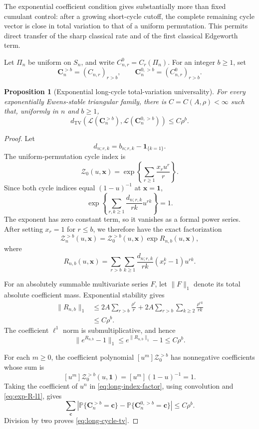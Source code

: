 \documentclass[11pt]{article}
\newtheorem{proposition}[theorem]{Proposition}
\theoremstyle{definition}
\theoremstyle{remark}
\newcommand{\Pp}{\mathbb P}
\newcommand{\one}{\mathbf 1}
\newcommand{\TV}{\mathrm{TV}}
\newcommand{\cL}{\mathcal L}
\newcommand{\cZ}{\mathcal Z}
\begin{document}
The exponential coefficient condition gives substantially more than fixed
cumulant control: after a growing short-cycle cutoff, the complete remaining
cycle vector is close in total variation to that of a uniform permutation.
This permits direct transfer of the sharp classical rate and of the first classical Edgeworth term.

Let $\Pi_n$ be uniform on $S_n$, and write $C^0_{n,r}=C_r(\Pi_n)$.
For an integer $b\ge1$, set
\[
 \mathbf C_n^{>b}=(C_{n,r})_{r>b},
 \qquad
 \mathbf C_n^{0,>b}=(C^0_{n,r})_{r>b}.
\]

\begin{proposition}[Exponential long-cycle total-variation universality]
\label{prop:long-cycle-tv}
For every exponentially Ewens-stable triangular family, there is
$C=C(A,\rho)<\infty$ such that, uniformly in $n$ and $b\ge1$,
\begin{equation}\label{eq:long-cycle-tv}
 d_{\TV}\!\left(
 \cL(\mathbf C_n^{>b}),
 \cL(\mathbf C_n^{0,>b})
 \right)
 \le C\rho^b.
\end{equation}
\end{proposition}

\begin{proof}
Let
\[
 d_{n;r,k}=b_{n;r,k}-\one_{\{k=1\}}.
\]
The uniform-permutation cycle index is
\[
 \cZ_0(u,\mathbf x)
 =\exp\left\{\sum_{r\ge1}\frac{x_ru^r}{r}\right\}.
\]
Since both cycle indices equal $(1-u)^{-1}$ at $\mathbf x=\mathbf1$,
\[
 \exp\left\{
 \sum_{r,k\ge1}\frac{d_{n;r,k}}{rk}u^{rk}
 \right\}=1.
\]
The exponent has zero constant term, so it vanishes as a formal power
series.  After setting $x_r=1$ for $r\le b$, we therefore have the exact
factorization
\begin{equation}\label{eq:long-index-factor}
 \cZ_n^{>b}(u,\mathbf x)
 =\cZ_0^{>b}(u,\mathbf x)\exp R_{n,b}(u,\mathbf x),
\end{equation}
where
\[
 R_{n,b}(u,\mathbf x)
 =\sum_{r>b}\sum_{k\ge1}
 \frac{d_{n;r,k}}{rk}(x_r^k-1)u^{rk}.
\]

For an absolutely summable multivariate series $F$, let $\|F\|_1$ denote
its total absolute coefficient mass.  Exponential stability gives
\begin{align*}
 \|R_{n,b}\|_1
 &\le
 2A\sum_{r>b}\frac{\rho^r}{r}
 +2A\sum_{r>b}\sum_{k\ge2}\frac{\rho^{rk}}{rk}
 \\
 &\le C\rho^b.
\end{align*}
The coefficient $\ell^1$ norm is submultiplicative, and hence
\begin{equation}\label{eq:exp-R-l1}
 \|e^{R_{n,b}}-1\|_1
 \le e^{\|R_{n,b}\|_1}-1
 \le C\rho^b.
\end{equation}

For each $m\ge0$, the coefficient polynomial
$[u^m]\cZ_0^{>b}$ has nonnegative coefficients whose sum is
\[
 [u^m]\cZ_0^{>b}(u,\mathbf1)
 =[u^m](1-u)^{-1}=1.
\]
Taking the coefficient of $u^n$ in
\eqref{eq:long-index-factor}, using convolution and
\eqref{eq:exp-R-l1}, gives
\[
 \sum_{\mathbf c}
 \left|
 \Pp\{\mathbf C_n^{>b}=\mathbf c\}
 -\Pp\{\mathbf C_n^{0,>b}=\mathbf c\}
 \right|
 \le C\rho^b.
\]
Division by two proves \eqref{eq:long-cycle-tv}.
\end{proof}
\end{document}
